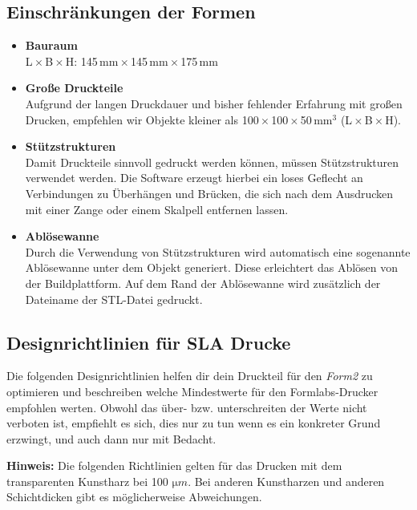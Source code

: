 \documentclass{\basedir/fablab-document}
\begin{document}
\subsection{Einschränkungen der Formen}
\begin{itemize}
    \item \textbf{Bauraum}\\L\,$\times$\,B\,$\times$\,H\@: 145\,mm\,$\times$\,145\,mm\,$\times$\,175\,mm
    \item \textbf{Große Druckteile}\\Aufgrund der langen Druckdauer und bisher fehlender Erfahrung mit großen Drucken, empfehlen wir Objekte kleiner als 100\,$\times$\,100\,$\times$\,50\,$\mathrm{mm}^3$ (L\,$\times$\,B\,$\times$\,H).
    \item \textbf{Stützstrukturen}\\Damit Druckteile sinnvoll gedruckt werden können, müssen Stützstrukturen verwendet werden. Die Software erzeugt hierbei ein loses Geflecht an Verbindungen zu Überhängen und Brücken, die sich nach dem Ausdrucken mit einer Zange oder einem Skalpell entfernen lassen.
    \item \textbf{Ablösewanne}\\Durch die Verwendung von Stützstrukturen wird automatisch eine sogenannte Ablösewanne unter dem Objekt generiert. Diese erleichtert das Ablösen von der Buildplattform. Auf dem Rand der Ablösewanne wird zusätzlich der Dateiname der STL-Datei gedruckt.
\end{itemize}

\subsection{Designrichtlinien für SLA Drucke}

Die folgenden Designrichtlinien helfen dir dein Druckteil für den \textit{Form2} zu optimieren und beschreiben welche Mindestwerte für den Formlabs-Drucker empfohlen werten. Obwohl das über- bzw. unterschreiten der Werte nicht verboten ist, empfiehlt es sich, dies nur zu tun wenn es ein konkreter Grund erzwingt, und auch dann nur mit Bedacht.

\textbf{Hinweis:} Die folgenden Richtlinien gelten für das Drucken mit dem transparenten Kunstharz bei 100 $\mathrm{\mu}m$. Bei anderen Kunstharzen und anderen Schichtdicken gibt es möglicherweise Abweichungen.
\end{document}
